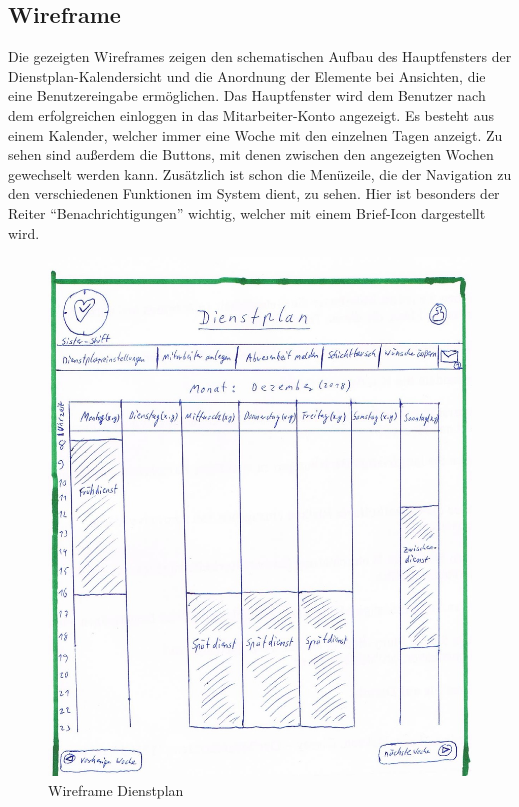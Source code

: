 \documentclass[11pt,
paper=a4,
bibtotocnumbered,	  %
liststotocnumbered,  %
DIV=calc,		  %
tablecaptionabove,	  %
headinclude,
]{article}
\begin{document}
\subsection{Wireframe}
Die gezeigten Wireframes zeigen den schematischen Aufbau des Hauptfensters der Dienstplan-Kalendersicht und die Anordnung der Elemente bei Ansichten, die eine Benutzereingabe ermöglichen. Das Hauptfenster wird dem Benutzer nach dem erfolgreichen einloggen in das Mitarbeiter-Konto angezeigt. Es besteht aus einem Kalender, welcher immer eine Woche mit den einzelnen Tagen anzeigt. Zu sehen sind außerdem die Buttons, mit denen zwischen den angezeigten Wochen gewechselt werden kann. Zusätzlich ist schon die Menüzeile, die der Navigation zu den verschiedenen Funktionen im System dient, zu sehen. Hier ist besonders der Reiter “Benachrichtigungen” wichtig, welcher mit einem Brief-Icon dargestellt wird.
\begin{figure}[H]
\includegraphics[width=1\textwidth]{Bilder/Wireframe.jpg}
\caption{Wireframe Dienstplan}
\end{figure}
\end{document}
